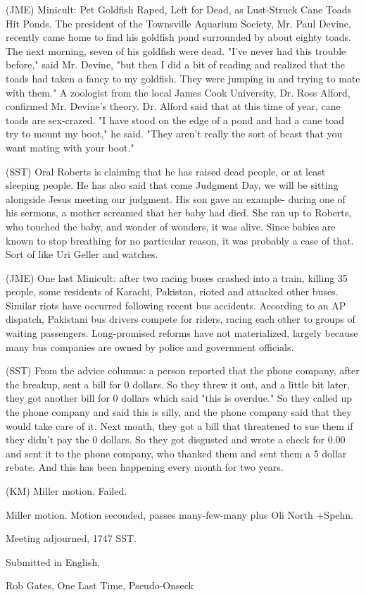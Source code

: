 \documentclass[12pt]{article}
\begin{document}
(JME) Minicult: Pet Goldfish Raped, Left for Dead, as Lust-Struck Cane Toads Hit Ponds. The president of the Townsville Aquarium Society, Mr. Paul Devine, recently came home to find his goldfish pond surrounded by about eighty toads. The next morning, seven of his goldfish were dead. "I've never had this trouble before," said Mr. Devine, "but then I did a bit of reading and realized that the toads had taken a fancy to my goldfish. They were jumping in and trying to mate with them." A zoologist from the local James Cook University, Dr. Ross Alford, confirmed Mr. Devine's theory. Dr. Alford said that at this time of year, cane toads are sex-crazed. "I have stood on the edge of a pond and had a cane toad try to mount my boot," he said. "They aren't really the sort of beast that you want mating with your boot."

(SST) Oral Roberts is claiming that he has raised dead people, or at least sleeping people. He has also said that come Judgment Day, we will be sitting alongside Jesus meeting our judgment. His son gave an example- during one of his sermons, a mother screamed that her baby had died. She ran up to Roberts, who touched the baby, and wonder of wonders, it was alive. Since babies are known to stop breathing for no particular reason, it was probably a case of that. Sort of like Uri Geller and watches.

(JME) One last Minicult: after two racing buses crashed into a train, killing 35 people, some residents of Karachi, Pakistan, rioted and attacked other buses. Similar riots have occurred following recent bus accidents. According to an AP dispatch, Pakistani bus drivers compete for riders, racing each other to groups of waiting passengers. Long-promised reforms have not materialized, largely because many bus companies are owned by police and government officials.

(SST) From the advice columns: a person reported that the phone company, after the breakup, sent a bill for 0 dollars. So they threw it out, and a little bit later, they got another bill for 0 dollars which said "this is overdue." So they called up the phone company and said this is silly, and the phone company said that they would take care of it. Next month, they got a bill that threatened to sue them if they didn't pay the 0 dollars. So they got disgusted and wrote a check for 0.00 and sent it to the phone company, who thanked them and sent them a 5 dollar rebate. And this has been happening every month for two years.

(KM) Miller motion. Failed.

Miller motion. Motion seconded, passes many-few-many plus Oli North +Spehn.

\vspace{12pt}

\noindent
Meeting adjourned, 1747 SST.

\vspace{18pt}

\centerline{Submitted in English,}
\centerline{Rob Gates, One Last Time, Pseudo-Onseck}
\end{document}
